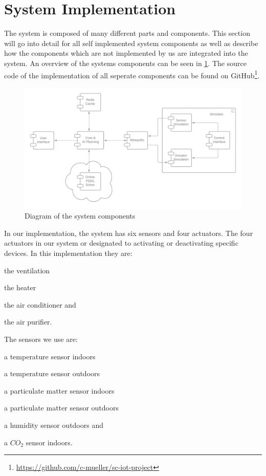 \section{System Implementation}\label{sec:system-implementation}

The system is composed of many different parts and components. 
This section will go into detail for all self implemented system components as well as describe how the components which are not implemented by us are integrated into the system.
An overview of the systems components can be seen in \cref{fig:implementation-architecture}.
The source code of the implementation of all seperate components can be found on GitHub\footnote{\url{https://github.com/c-mueller/sc-iot-project}}.

\begin{figure}
    \centering
    \includegraphics[width=\linewidth]{img/implementation-architecture.png}
    \caption{Diagram of the system components}
    \label{fig:implementation-architecture}
\end{figure}

In our implementation, the system has six sensors and four actuators. The four actuators in our system or designated to activating or deactivating specific devices. In this implementation they are: 
\begin{inparaenum}[1)]
    \item the ventilation
    \item the heater
    \item the air conditioner and
    \item the air purifier.
\end{inparaenum}
The sensors we use are: 
\begin{inparaenum}[1)]
    \item a temperature sensor indoors
    \item a temperature sensor outdoors
    \item a particulate matter sensor indoors
    \item a particulate matter sensor outdoors
    \item a humidity sensor outdoors and
    \item a $CO_2$ sensor indoors.
\end{inparaenum}

%





